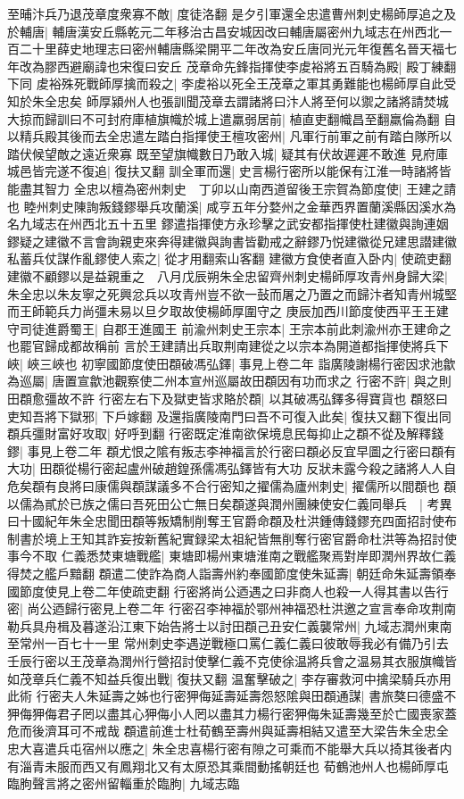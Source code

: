 至晡汴兵乃退茂章度衆寡不敵|{
	度徒洛翻}
是夕引軍還全忠遣曹州刺史楊師厚追之及於輔唐|{
	輔唐漢安丘縣乾元二年移治古昌安城因改曰輔唐屬密州九域志在州西北一百二十里薛史地理志曰密州輔唐縣梁開平二年改為安丘唐同光元年復舊名晉天福七年改為膠西避廟諱也宋復曰安丘}
茂章命先鋒指揮使李䖍裕將五百騎為殿|{
	殿丁練翻下同}
䖍裕殊死戰師厚擒而殺之|{
	李䖍裕以死全王茂章之軍其勇難能也楊師厚自此受知於朱全忠矣}
師厚潁州人也張訓聞茂章去謂諸將曰汴人將至何以禦之諸將請焚城大掠而歸訓曰不可封府庫植旗幟於城上遣羸弱居前|{
	植直吏翻幟昌至翻羸倫為翻}
自以精兵殿其後而去全忠遣左踏白指揮使王檀攻密州|{
	凡軍行前軍之前有踏白隊所以踏伏候望敵之遠近衆寡}
既至望旗幟數日乃敢入城|{
	疑其有伏故遲遲不敢進}
見府庫城邑皆完遂不復追|{
	復扶又翻}
訓全軍而還|{
	史言楊行密所以能保有江淮一時諸將皆能盡其智力}
全忠以檀為密州刺史　丁卯以山南西道留後王宗賀為節度使|{
	王建之請也}
睦州刺史陳詢叛錢鏐舉兵攻蘭溪|{
	咸亨五年分婺州之金華西界置蘭溪縣因溪水為名九域志在州西北五十五里}
鏐遣指揮使方永珍擊之武安都指揮使杜建徽與詢連姻鏐疑之建徽不言會詢親吏來奔得建徽與詢書皆勸戒之辭鏐乃悦建徽從兄建思譛建徽私蓄兵仗謀作亂鏐使人索之|{
	從才用翻索山客翻}
建徽方食使者直入卧内|{
	使疏吏翻}
建徽不顧鏐以是益親重之　八月戊辰朔朱全忠留齊州刺史楊師厚攻青州身歸大梁|{
	朱全忠以朱友寧之死興忿兵以攻青州豈不欲一鼔而屠之乃置之而歸汴者知青州城堅而王師範兵力尚彊未易以旦夕取故使楊師厚圍守之}
庚辰加西川節度使西平王王建守司徒進爵蜀王|{
	自郡王進國王}
前渝州刺史王宗本|{
	王宗本前此刺渝州亦王建命之也罷官歸成都故稱前}
言於王建請出兵取荆南建從之以宗本為開道都指揮使將兵下峽|{
	峽三峽也}
初寧國節度使田頵破馮弘鐸|{
	事見上卷二年}
詣廣陵謝楊行密因求池歙為巡屬|{
	唐置宣歙池觀察使二州本宣州巡屬故田頵因有功而求之}
行密不許|{
	與之則田頵愈彊故不許}
行密左右下及獄吏皆求賂於頵|{
	以其破馮弘鐸多得寶貨也}
頵怒曰吏知吾將下獄邪|{
	下戶嫁翻}
及還指廣陵南門曰吾不可復入此矣|{
	復扶又翻下復出同}
頵兵彊財富好攻取|{
	好呼到翻}
行密既定淮南欲保境息民每抑止之頵不從及解釋錢鏐|{
	事見上卷二年}
頵尤恨之隂有叛志李神福言於行密曰頵必反宜早圖之行密曰頵有大功|{
	田頵從楊行密起盧州破趙鍠孫儒馮弘鐸皆有大功}
反狀未露今殺之諸將人人自危矣頵有良將曰康儒與頵謀議多不合行密知之擢儒為廬州刺史|{
	擢儒所以間頵也}
頵以儒為貳於已族之儒曰吾死田公亡無日矣頵遂與潤州團練使安仁義同舉兵　|{
	考異曰十國紀年朱全忠聞田頵等叛矯制削奪王官爵命頵及杜洪鍾傳錢鏐充四面招討使布制書於境上王知其詐妄按新舊紀實録梁太祖紀皆無削奪行密官爵命杜洪等為招討使事今不取}
仁義悉焚東塘戰艦|{
	東塘即楊州東塘淮南之戰艦聚焉對岸即潤州界故仁義得焚之艦戶黯翻}
頵遣二使詐為商人詣壽州約奉國節度使朱延壽|{
	朝廷命朱延壽領奉國節度使見上卷二年使疏吏翻}
行密將尚公迺遇之曰非商人也殺一人得其書以告行密|{
	尚公迺歸行密見上卷二年}
行密召李神福於鄂州神福恐杜洪邀之宣言奉命攻荆南勒兵具舟楫及暮遂沿江東下始告將士以討田頵己丑安仁義襲常州|{
	九域志潤州東南至常州一百七十一里}
常州刺史李遇逆戰極口罵仁義仁義曰彼敢辱我必有備乃引去壬辰行密以王茂章為潤州行營招討使擊仁義不克使徐温將兵會之温易其衣服旗幟皆如茂章兵仁義不知益兵復出戰|{
	復扶又翻}
温奮擊破之|{
	李存審救河中擒梁騎兵亦用此術}
行密夫人朱延壽之姊也行密狎侮延壽延壽怨怒隂與田頵通謀|{
	書旅獒曰德盛不狎侮狎侮君子罔以盡其心狎侮小人罔以盡其力楊行密狎侮朱延壽幾至於亡國喪家蓋危而後濟耳可不戒哉}
頵遣前進士杜荀鶴至壽州與延壽相結又遣至大梁告朱全忠全忠大喜遣兵屯宿州以應之|{
	朱全忠喜楊行密有隙之可乘而不能舉大兵以掎其後者内有淄青未服而西又有鳳翔北又有太原恐其乘間動搖朝廷也}
荀鶴池州人也楊師厚屯臨朐聲言將之密州留輜重於臨朐|{
	九域志臨}



